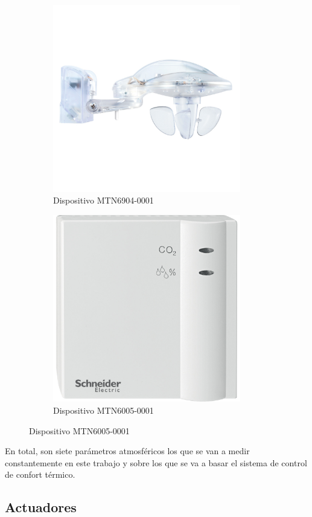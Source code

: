 \begin{figure}[h]
    \begin{subfigure}{0.5\textwidth}
        \centering
        \includegraphics[width=0.9\textwidth, keepaspectratio]{imagenes/capitulo3/estacionMeteorologica.jpg}
        \caption{Dispositivo MTN6904-0001}
        \label{fig:estacionMeteorologica}
    \end{subfigure}
    \begin{subfigure}{0.5\textwidth}
        \centering
        \includegraphics[width=0.9\textwidth, keepaspectratio]{imagenes/capitulo3/sondaTempHumeCO2.jpg}
        \caption{Dispositivo MTN6005-0001}
        \label{fig:sondaParametrosInterior}
    \end{subfigure}
\end{figure}

En total, son siete parámetros atmosféricos los que se van a medir constantemente en este trabajo y sobre los que se va a basar el sistema de control de confort térmico.



\subsection{Actuadores}